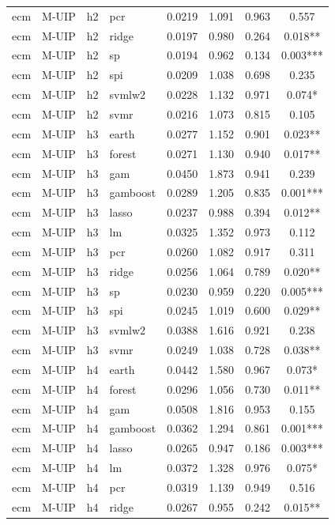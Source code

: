\begin{ThreePartTable}
\begin{longtable}[t]{llclcccc}
ecm & M-UIP & h2 & pcr & 0.0219 & 1.091 & 0.963 & 0.557\\
ecm & M-UIP & h2 & ridge & 0.0197 & 0.980 & 0.264 & 0.018**\\
ecm & M-UIP & h2 & sp & 0.0194 & 0.962 & 0.134 & 0.003***\\
ecm & M-UIP & h2 & spi & 0.0209 & 1.038 & 0.698 & 0.235\\
ecm & M-UIP & h2 & svmlw2 & 0.0228 & 1.132 & 0.971 & 0.074*\\
ecm & M-UIP & h2 & svmr & 0.0216 & 1.073 & 0.815 & 0.105\\
\addlinespace
ecm & M-UIP & h3 & earth & 0.0277 & 1.152 & 0.901 & 0.023**\\
ecm & M-UIP & h3 & forest & 0.0271 & 1.130 & 0.940 & 0.017**\\
ecm & M-UIP & h3 & gam & 0.0450 & 1.873 & 0.941 & 0.239\\
ecm & M-UIP & h3 & gamboost & 0.0289 & 1.205 & 0.835 & 0.001***\\
ecm & M-UIP & h3 & lasso & 0.0237 & 0.988 & 0.394 & 0.012**\\
ecm & M-UIP & h3 & lm & 0.0325 & 1.352 & 0.973 & 0.112\\
ecm & M-UIP & h3 & pcr & 0.0260 & 1.082 & 0.917 & 0.311\\
ecm & M-UIP & h3 & ridge & 0.0256 & 1.064 & 0.789 & 0.020**\\
ecm & M-UIP & h3 & sp & 0.0230 & 0.959 & 0.220 & 0.005***\\
ecm & M-UIP & h3 & spi & 0.0245 & 1.019 & 0.600 & 0.029**\\
ecm & M-UIP & h3 & svmlw2 & 0.0388 & 1.616 & 0.921 & 0.238\\
ecm & M-UIP & h3 & svmr & 0.0249 & 1.038 & 0.728 & 0.038**\\
\addlinespace
ecm & M-UIP & h4 & earth & 0.0442 & 1.580 & 0.967 & 0.073*\\
ecm & M-UIP & h4 & forest & 0.0296 & 1.056 & 0.730 & 0.011**\\
ecm & M-UIP & h4 & gam & 0.0508 & 1.816 & 0.953 & 0.155\\
ecm & M-UIP & h4 & gamboost & 0.0362 & 1.294 & 0.861 & 0.001***\\
ecm & M-UIP & h4 & lasso & 0.0265 & 0.947 & 0.186 & 0.003***\\
ecm & M-UIP & h4 & lm & 0.0372 & 1.328 & 0.976 & 0.075*\\
ecm & M-UIP & h4 & pcr & 0.0319 & 1.139 & 0.949 & 0.516\\
ecm & M-UIP & h4 & ridge & 0.0267 & 0.955 & 0.242 & 0.015**\\

\end{longtable}
\end{ThreePartTable}
